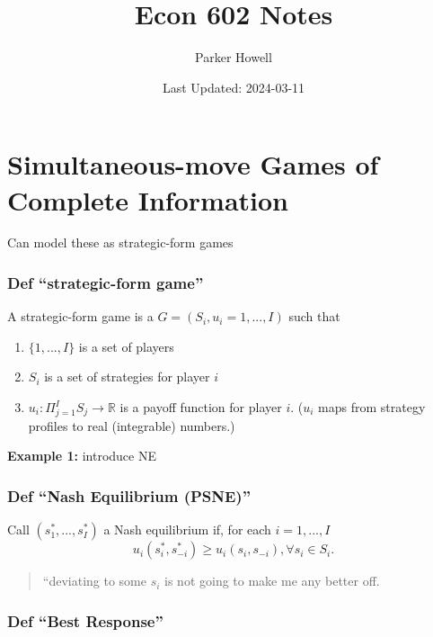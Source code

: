 \documentclass[
]{article}
\title{Econ 602 Notes}
\author{Parker Howell}
\date{Last Updated: 2024-03-11}
\providecommand{\tightlist}{%
  \setlength{\itemsep}{0pt}\setlength{\parskip}{0pt}}
\begin{document}
\maketitle

\hypertarget{simultaneous-move-games-of-complete-information}{%
\section{Simultaneous-move Games of Complete
Information}\label{simultaneous-move-games-of-complete-information}}

Can model these as strategic-form games

\hypertarget{def-strategic-form-game}{%
\subsubsection{Def ``strategic-form
game''}\label{def-strategic-form-game}}

A strategic-form game is a \(G = (S_i, u_i = 1, ..., I)\) such that

\begin{enumerate}
\def\labelenumi{\arabic{enumi}.}
\tightlist
\item
  \(\{1, ..., I\}\) is a set of players
\item
  \(S_i\) is a set of strategies for player \(i\)
\item
  \(u_i: \Pi_{j=1}^I S_j \rightarrow \mathbb{R}\) is a payoff function
  for player \(i\). (\(u_i\) maps from strategy profiles to real
  (integrable) numbers.)
\end{enumerate}

\textbf{Example 1:} introduce NE

\hypertarget{def-nash-equilibrium-psne}{%
\subsubsection{Def ``Nash Equilibrium
(PSNE)''}\label{def-nash-equilibrium-psne}}

Call \((s_1^*, ... ,s_I^*)\) a Nash equilibrium if, for each
\(i = 1, ..., I\)
\[u_i(s_i^*, s_{-i}^*) \geq u_i(s_i, s_{-i}), \forall s_i \in S_i.\]

\begin{quote}
``deviating to some \(s_i\) is not going to make me any better off.
\end{quote}

\hypertarget{def-best-response}{%
\subsubsection{Def ``Best Response''}\label{def-best-response}}
\end{document}
